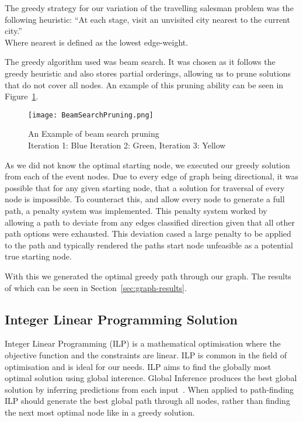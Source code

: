 \documentclass[bsc,frontabs,twoside,singlespacing,parskip,deptreport]{infthesis}     %
\begin{document}
The greedy strategy for our variation of the travelling salesman problem was the following heuristic:
``At each stage, visit an unvisited city nearest to the current city.''\\
Where nearest is defined as the lowest edge-weight.


The greedy algorithm used was beam search.
It was chosen as it follows the greedy heuristic and also stores partial orderings,
allowing us to prune solutions that do not cover all nodes.
An example of this pruning ability can be seen in Figure~\ref{fig:beam-prune}.

\begin{figure}
  \centering
  \texttt{[image: BeamSearchPruning.png]}
  \caption{An Example of beam search pruning\\ Iteration 1: Blue Iteration 2: Green, Iteration 3: Yellow}
  \label{fig:beam-prune}
\end{figure}

As we did not know the optimal starting node, we executed our greedy solution from each of the event nodes.
Due to every edge of graph being directional, it was possible that for any given starting node, that a solution for traversal
of every node is impossible. To counteract this, and allow every node to generate a full path, a penalty system was implemented.
This penalty system worked by allowing a path to deviate from any edges classified direction given that all other path options
were exhausted. This deviation cased a large penalty to be applied to the path and typically rendered the paths start node
unfeasible as a potential true starting node. 

With this we generated the optimal greedy path through our graph. The results of which can be seen in Section~\ref{sec:graph-results}.

\subsection{Integer Linear Programming Solution}
Integer Linear Programming (ILP) is a mathematical optimisation where the objective function and the constraints are linear.
ILP is common in the field of optimisation and is ideal for our needs. ILP aims to find the globally most optimal solution using global interence.
Global Inference produces the best global solution by inferring predictions from each input~\cite{roth2004linear}.%
When applied to path-finding ILP should generate the best global path through all nodes, rather than finding the next most optimal node like in a greedy solution.
\end{document}
